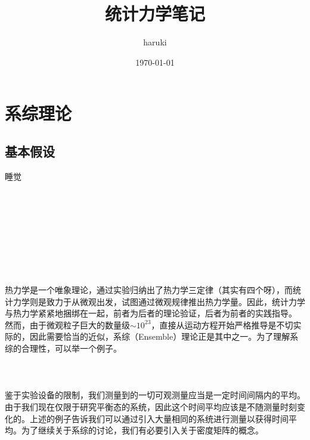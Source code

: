 \documentclass[hyperref,UTF8]{ctexbook}
\title{统计力学笔记}
\author{haruki}
\date{\today}
\begin{document}
\maketitle
\thispagestyle{empty}
\tableofcontents
\thispagestyle{empty}
\newpage
\setcounter{page}{1}
\chapter{系综理论}
\section{基本假设}
\begin{fiction}
	睡觉\\
	\\
	\\
	\\
	\\
	\\
	\\
	\\
	\\
	
\end{fiction}
\newpage
热力学是一个唯象理论，通过实验归纳出了热力学三定律（其实有四个呀），而统计力学则是致力于从微观出发，试图通过微观规律推出热力学量。因此，统计力学与热力学紧紧地捆绑在一起，前者为后者的理论验证，后者为前者的实践指导。\\
\indent 然而，由于微观粒子巨大的数量级$\sim10^{23}$，直接从运动方程开始严格推导是不切实际的，因此需要恰当的近似，系综（Ensemble）理论正是其中之一。为了理解系综的合理性，可以举一个例子。\\
\\
\\
\\
\indent 鉴于实验设备的限制，我们测量到的一切可观测量应当是一定时间间隔内的平均。由于我们现在仅限于研究平衡态的系统，因此这个时间平均应该是不随测量时刻变化的。上述的例子告诉我们可以通过引入大量相同的系统进行测量以获得时间平均。为了继续关于系综的讨论，我们有必要引入关于密度矩阵的概念。\\
\end{document}
